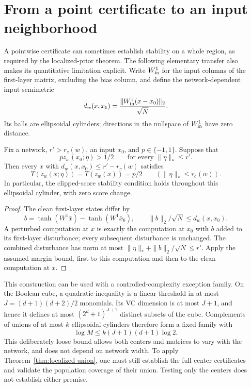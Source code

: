 \section{From a point certificate to an input neighborhood}
\label{sec:certified-input-neighborhoods}

A pointwise certificate can sometimes establish stability on a whole
region, as required by the localized-prior theorem. The following
elementary transfer also makes its quantitative limitation explicit.
Write $W^1_{\rm in}$ for the input columns of the first-layer matrix,
excluding the bias column, and define the network-dependent input
semimetric
\[
 d_w(x,x_0)=\frac{\|W^1_{\rm in}(x-x_0)\|_2}{\sqrt N}.
\]
Its balls are ellipsoidal cylinders; directions in the nullspace of
$W^1_{\rm in}$ have zero distance.

\begin{lemma}
\label{lem:input-neighborhood-transfer}
Fix a network, $r'>r_c(w)$, an input $x_0$, and $p\in\{-1,1\}$.
Suppose that
\[
 pz_w(x_0;\eta)>1/2\qquad\text{for every }\|\eta\|_*\le r'.
\]
Then every $x$ with $d_w(x,x_0)\le r'-r_c(w)$ satisfies
\[
 T(z_w(x;\eta))=T(z_w(x))=p/2
 \qquad(\|\eta\|_*\le r_c(w)).
\]
In particular, the clipped-score stability condition holds throughout
this ellipsoidal cylinder, with zero score change.
\end{lemma}
\begin{proof}
The clean first-layer states differ by
\[
 b=\tanh(W^1\bar x)-\tanh(W^1\bar x_0),\qquad
 \|b\|_2/\sqrt N\le d_w(x,x_0).
\]
A perturbed computation at $x$ is exactly the computation at $x_0$ with
$b$ added to its first-layer disturbance; every subsequent disturbance
is unchanged. The combined disturbance has norm at most
$\|\eta\|_*+\|b\|_2/\sqrt N\le r'$. Apply the assumed margin bound,
first to this computation and then to the clean computation at $x$.
\end{proof}

This construction can be used with a controlled-complexity exception
family. On the Boolean cube, a quadratic inequality is a linear
threshold in at most $J=(d+1)(d+2)/2$ monomials. Its VC dimension is at
most $J+1$, and hence it defines at most $(2^d+1)^{J+1}$ distinct
subsets of the cube. Complements of unions of at most $k$ ellipsoidal
cylinders therefore form a fixed family with
\[
 \log M\le k(J+1)(d+1)\log2.
\]
This deliberately loose bound allows both centers and matrices to vary
with the network, and does not depend on network width. To apply
Theorem~\ref{thm:localized-union}, one must still establish the full
center certificates and validate the population coverage of their
union. Testing only the centers does not establish either premise.

